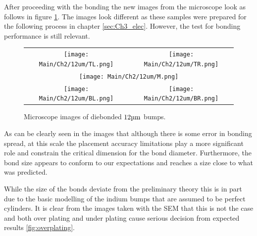 After proceeding with the bonding the new images from the microscope look as follows in figure \ref{fig:12um_bumps_microscope}. The images look different as these samples were prepared for the following process in chapter \ref{sec:Ch3_elec}. However, the test for bonding performance is still relevant.


\begin{figure}
    \centering
    \def\w{0.35\textwidth}
    \begin{tabular}{cc}
        \texttt{[image: Main/Ch2/12um/TL.png]} &
        \texttt{[image: Main/Ch2/12um/TR.png]} \\
        \multicolumn{2}{c}{\texttt{[image: Main/Ch2/12um/M.png]}} \\
        \texttt{[image: Main/Ch2/12um/BL.png]} &
        \texttt{[image: Main/Ch2/12um/BR.png]}
    \end{tabular}
    \caption{Microscope images of diebonded $12 \um$ bumps.}
    \label{fig:12um_bumps_microscope}
\end{figure}



As can be clearly seen in the images that although there is some error in bonding spread, at this scale the placement accuracy limitations play a more significant role and constrain the critical dimension for the bond diameter. Furthermore, the bond size appears to conform to our expectations and reaches a size close to what was predicted.

While the size of the bonds deviate from the preliminary theory this is in part due to the basic modelling of the indium bumps that are assumed to be perfect cylinders. It is clear from the images taken with the SEM that this is not the case and both over plating and under plating cause serious decision from expected results \ref{fig:overplating}.

